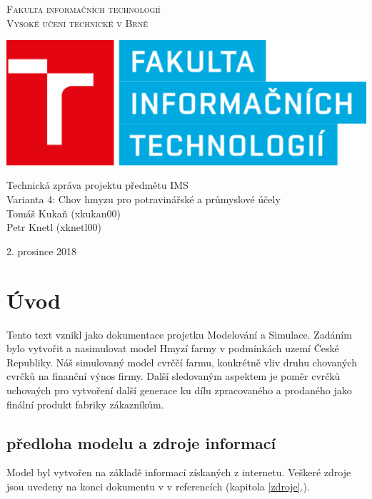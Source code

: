 \documentclass[a4paper, 12pt]{article}
\begin{document}
\begin{center} 
\thispagestyle{empty}
\Huge
\textsc{Fakulta informačních technologií\\Vysoké učení
technické v Brně}\\

\includegraphics[scale = 0.5]{fit-logo.eps}


\LARGE Technická zpráva projektu předmětu IMS\\
\Huge Varianta 4: Chov hmyzu pro potravinářské a průmyslové účely \\
\Huge
Tomáš Kukaň (xkukan00) \\
Petr Knetl (xknetl00) \\

\end{center}
{\LARGE \hfill
2. prosince 2018}

\newpage

\tableofcontents
{}
\thispagestyle{empty}
\setcounter{page}{1}
\newpage

\section{Úvod}
Tento text vznikl jako dokumentace projetku Modelování a Simulace. Zadáním bylo vytvořit a nasimulovat model Hmyzí farmy v podmínkách uzemí České Republiky. Náš simulovaný model cvrččí farmu, konkrétně vliv druhu chovaných cvrčků na finanční výnos firmy. Další sledovaným aspektem je poměr cvrčků uchovaých pro vytvoření další generace ku dílu zpracovaného a prodaného jako finální produkt fabriky zákazníkům.

\subsection{předloha modelu a zdroje informací}
Model byl vytvořen na základě informací získaných z internetu. Veškeré zdroje jsou uvedeny na konci dokumentu v v referencích (kapitola \ref{zdroje}.).
\end{document}
